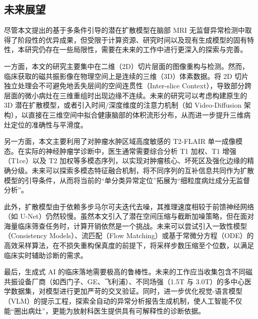 \documentclass[Win]{xjtuBSThesis}  %
\begin{document}
\subsection{未来展望}

尽管本文提出的基于多条件引导的潜在扩散模型在脑部 MRI 无监督异常检测中取得了阶段性的优异成果，但受限于计算资源、研究时间以及现有生成模型的固有特性，本研究仍存在一些局限性，需要在未来的工作中进行更深入的探索与完善。

一方面，本文的研究主要集中在二维（2D）切片层面的图像重构与检测。然而，临床获取的磁共振影像在物理空间上是连续的三维（3D）体素数据。将 2D 切片独立处理会不可避免地丢失层间的空间连贯性（Inter-slice Context），导致部分跨层面的微小病灶在三维重组时出现边缘不连续。未来的研究可以考虑构建原生的 3D 潜在扩散模型，或者引入时间/深度维度的注意力机制（如 Video-Diffusion 架构），以直接在三维空间中拟合健康脑部的体积流形分布，从而进一步提升三维病灶定位的准确性与平滑度。

另一方面，本文主要利用了对肿瘤水肿区域高度敏感的 T2-FLAIR 单一成像模态。在实际的神经肿瘤学诊断中，医生通常需要综合分析 T1 加权、T1 增强（T1ce）以及 T2 加权等多模态序列，以实现对肿瘤核心、坏死区及强化边缘的精确分级。未来可以探索多模态特征融合机制，将不同序列的互补信息共同作为扩散模型的引导条件，从而将当前的“单分类异常定位”拓展为“细粒度病灶成分无监督分析”。

此外，扩散模型由于依赖多步马尔可夫迭代去噪，其推理速度相较于前馈神经网络（如 U-Net）仍然较慢。虽然本文引入了潜在空间压缩与截断加噪策略，但在面对海量临床筛查任务时，计算开销依然是一个挑战。未来可以尝试引入一致性模型（Consistency Models）、流匹配（Flow Matching）或基于常微分方程（ODE）的高效采样算法，在不损失重构保真度的前提下，将采样步数压缩至个位数，以满足临床实时辅助诊断的需求。

最后，生成式 AI 的临床落地需要极高的鲁棒性。未来的工作应当收集包含不同磁共振设备厂商（如西门子、GE、飞利浦）、不同场强（1.5T 与 3.0T）的多中心医学数据集，对模型进行更加严苛的交叉验证。同时，进一步优化视觉-语言模型（VLM）的提示工程，探索全自动的异常分析报告生成机制，使人工智能不仅能“圈出病灶”，更能为放射科医生提供具有可解释性的诊断依据。
\end{document}
